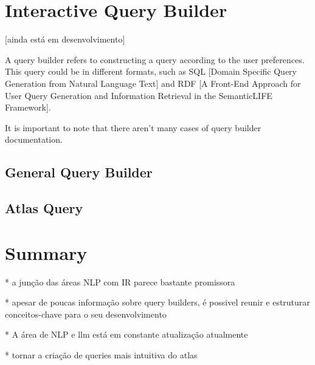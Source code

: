 

\section{Interactive Query Builder}

[ainda está em desenvolvimento]

A query builder refers to constructing a query according to the user preferences. This query could be in different formats, such as SQL [Domain Specific Query Generation from Natural Language Text] and RDF [A Front-End Approach for User Query Generation and Information Retrieval in the SemanticLIFE Framework]. 

It is important to note that there aren't many cases of query builder documentation.



\subsection{General Query Builder}



\subsection{Atlas Query}





\section{Summary}

* a junção das áreas NLP com IR parece bastante promissora

* apesar de poucas informação sobre query builders, é possivel reunir e estruturar conceitos-chave para o seu desenvolvimento

* A área de NLP e llm está em constante atualização atualmente


* tornar a criação de queries mais intuitiva do atlas